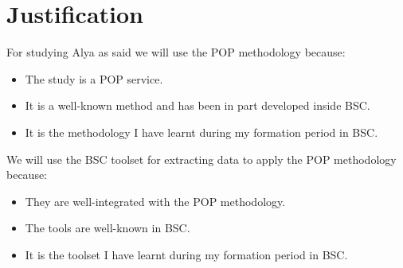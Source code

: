 \section{Justification}
For studying Alya as said we will use the POP methodology because:

\begin{itemize}
  \item The study is a POP service.
  \item It is a well-known method and has been in part developed inside BSC.
  \item It is the methodology I have learnt during my formation period in BSC.
\end{itemize}

We will use the BSC toolset for extracting data to apply the POP methodology because:

\begin{itemize}
  \item They are well-integrated with the POP methodology.
  \item The tools are well-known in BSC.
  \item It is the toolset I have learnt during my formation period in BSC.
\end{itemize}

\clearpage
